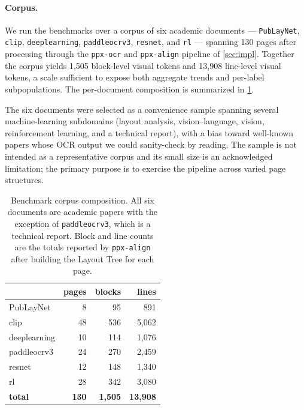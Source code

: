 \documentclass{article}
\theoremstyle{definition}
\begin{document}
\paragraph{Corpus.}
We run the benchmarks over a corpus of six academic documents ---
\texttt{PubLayNet}, \texttt{clip}, \texttt{deeplearning},
\texttt{paddleocrv3}, \texttt{resnet}, and \texttt{rl} --- spanning
130 pages after processing through the \texttt{ppx-ocr} and
\texttt{ppx-align} pipeline of \cref{sec:impl}.  Together the corpus
yields 1{,}505 block-level visual tokens and 13{,}908 line-level visual
tokens, a scale sufficient to expose both aggregate trends and
per-label subpopulations.  The per-document composition is summarized
in \cref{tab:bench-corpus}.

The six documents were selected as a convenience sample spanning
several machine-learning subdomains (layout analysis, vision--language,
vision, reinforcement learning, and a technical report), with a bias
toward well-known papers whose OCR output we could sanity-check by
reading.  The sample is not intended as a representative corpus and
its small size is an acknowledged limitation; the primary purpose is
to exercise the pipeline across varied page structures.

\begin{table}[h]
      \centering
      \small
      \begin{tabular}{lrrr}
            \toprule
                           & \textbf{pages} & \textbf{blocks}  & \textbf{lines}    \\
            \midrule
            PubLayNet      & 8              & 95               & 891               \\
            clip           & 48             & 536              & 5{,}062           \\
            deeplearning   & 10             & 114              & 1{,}076           \\
            paddleocrv3    & 24             & 270              & 2{,}459           \\
            resnet         & 12             & 148              & 1{,}340           \\
            rl             & 28             & 342              & 3{,}080           \\
            \midrule
            \textbf{total} & \textbf{130}   & \textbf{1{,}505} & \textbf{13{,}908} \\
            \bottomrule
      \end{tabular}
      \caption{Benchmark corpus composition.  All six documents are
            academic papers with the exception of \texttt{paddleocrv3},
            which is a technical report.  Block and line counts are the
            totals reported by \texttt{ppx-align} after building the
            Layout Tree for each page.}
      \label{tab:bench-corpus}
\end{table}
\end{document}
